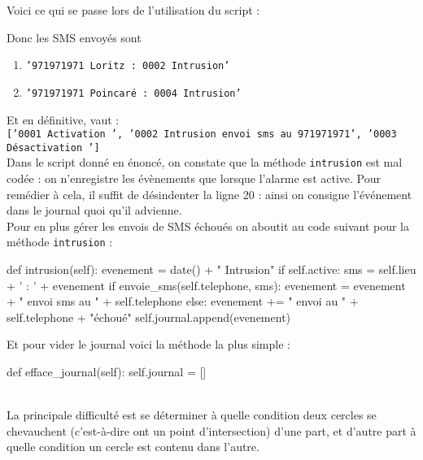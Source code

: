 \documentclass[a4paper,10pt,french]{book}
\begin{document}



Voici ce qui se passe lors de l'utilisation du script :


Donc les SMS envoyés sont
\begin{enumerate}[\textbullet]
	\item 	\texttt{'971971971 Loritz : 0002 Intrusion'}
	\item 	\texttt{'971971971 Poincaré : 0004 Intrusion'}
\end{enumerate}

Et en définitive,  vaut :\\

\texttt{['0001 Activation ', '0002 Intrusion envoi sms au 971971971', '0003 Désactivation ']}\\

Dans le script donné en énoncé, on constate que la méthode \texttt{intrusion} est mal codée : on n'enregistre les évènements que lorsque l'alarme
est active. Pour remédier à cela, il suffit de désindenter la ligne 20 : ainsi on consigne l'événement dans le journal quoi qu'il advienne.\\

Pour en plus gérer les envois de SMS échoués on aboutit au code suivant pour la méthode \texttt{intrusion} :

\begin{pythoncode}
def intrusion(self):
    evenement = date() + " Intrusion"
    if self.active:
        sms = self.lieu + ' : ' + evenement
        if envoie_sms(self.telephone, sms):
            evenement = evenement + " envoi sms au " + self.telephone
        else:
            evenement += " envoi au " + self.telephone + "échoué"
    self.journal.append(evenement)
\end{pythoncode}

Et pour vider le journal voici la méthode la plus simple :

\begin{pythoncode}
def efface_journal(self):
    self.journal = []
\end{pythoncode}

\\

La principale difficulté est se déterminer à quelle condition deux cercles se chevauchent (c'est-à-dire ont un point d'intersection) d'une part,
et d'autre part à quelle condition un cercle est contenu dans l'autre.
\end{document}
